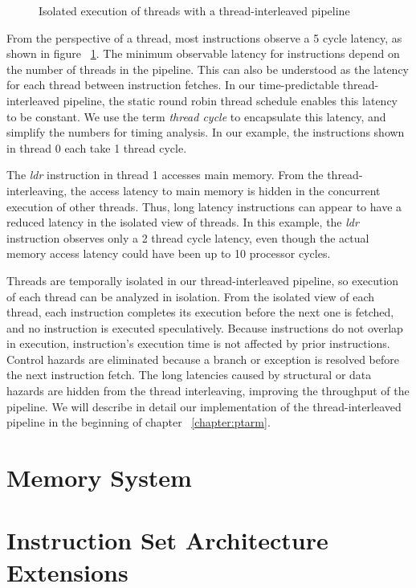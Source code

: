 \begin{figure}[h]
\begin{center}
\noindent{}
\end{center}
\vspace{-3mm}
\caption{Isolated execution of threads with a thread-interleaved pipeline}
\label{fig:thread_isolated_execution}
\end{figure}

From the perspective of a thread, most instructions observe a 5 cycle latency, as shown in figure ~\ref{fig:thread_isolated_execution}. 
The minimum observable latency for instructions depend on the number of threads in the pipeline. 
This can also be understood as the latency for each thread between instruction fetches.
In our time-predictable thread-interleaved pipeline, the static round robin thread schedule enables this latency to be constant.  
We use the term \emph{thread cycle} to encapsulate this latency, and simplify the numbers for timing analysis. 
In our example, the instructions shown in thread 0 each take 1 thread cycle.

The \emph{ldr} instruction in thread 1 accesses main memory.
From the thread-interleaving, the access latency to main memory is hidden in the concurrent execution of other threads. 
Thus, long latency instructions can appear to have a reduced latency in the isolated view of threads.
In this example, the \emph{ldr} instruction observes only a 2 thread cycle latency, even though the actual memory access latency could have been up to 10 processor cycles. 

Threads are temporally isolated in our thread-interleaved pipeline, so execution of each thread can be analyzed in isolation.
From the isolated view of each thread, each instruction completes its execution before the next one is fetched, and no instruction is executed speculatively.
Because instructions do not overlap in execution, instruction's execution time is not affected by prior instructions.
Control hazards are eliminated because a branch or exception is resolved before the next instruction fetch. 
The long latencies caused by structural or data hazards are hidden from the thread interleaving, improving the throughput of the pipeline.    
We will describe in detail our implementation of the thread-interleaved pipeline in the beginning of chapter ~\ref{chapter:ptarm}.

\section{Memory System}
\label{section:memory_system}


\section{Instruction Set Architecture Extensions}
\label{sec:programming_models}

